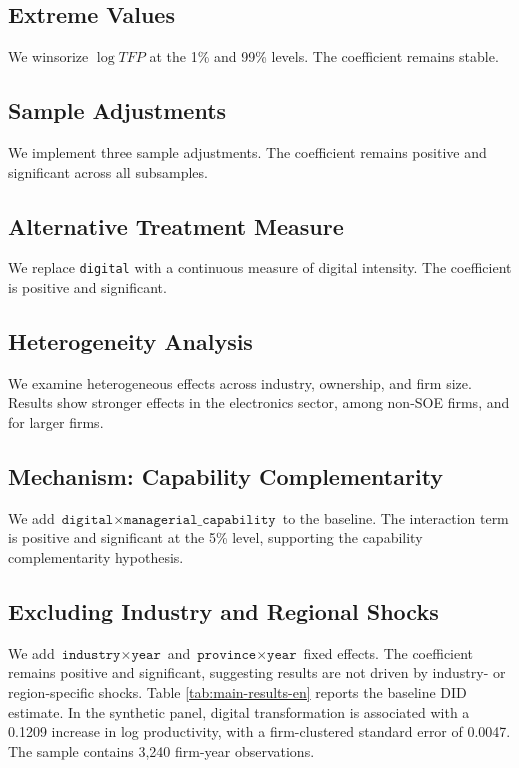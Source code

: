 \documentclass[11pt]{article}
\begin{document}
\subsection{Extreme Values}
We winsorize $\log TFP$ at the 1\% and 99\% levels. The coefficient remains stable.

\subsection{Sample Adjustments}
We implement three sample adjustments. The coefficient remains positive and significant across all subsamples.

\subsection{Alternative Treatment Measure}
We replace \texttt{digital} with a continuous measure of digital intensity. The coefficient is positive and significant.

\subsection{Heterogeneity Analysis}
We examine heterogeneous effects across industry, ownership, and firm size. Results show stronger effects in the electronics sector, among non-SOE firms, and for larger firms.

\subsection{Mechanism: Capability Complementarity}
We add $\texttt{digital} \times \texttt{managerial\_capability}$ to the baseline. The interaction term is positive and significant at the 5\% level, supporting the capability complementarity hypothesis.

\subsection{Excluding Industry and Regional Shocks}
We add $\texttt{industry} \times \texttt{year}$ and $\texttt{province} \times \texttt{year}$ fixed effects. The coefficient remains positive and significant, suggesting results are not driven by industry- or region-specific shocks.
Table \ref{tab:main-results-en} reports the baseline DID estimate. In the synthetic panel, digital transformation is associated with a 0.1209 increase in log productivity, with a firm-clustered standard error of 0.0047. The sample contains 3,240 firm-year observations.
\end{document}
